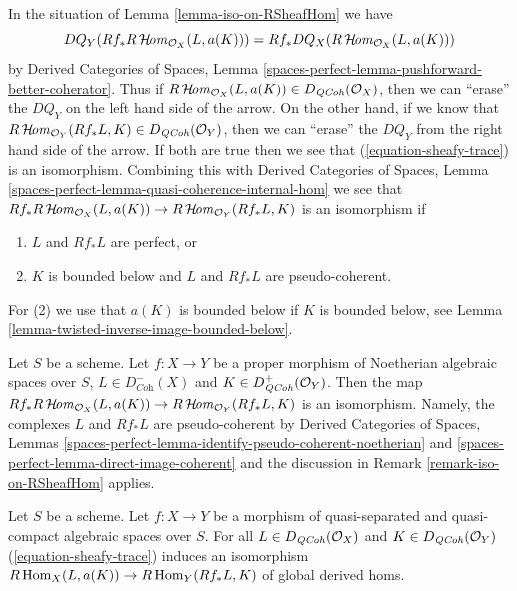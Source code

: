 \begin{remark}
\label{remark-iso-on-RSheafHom}
In the situation of Lemma \ref{lemma-iso-on-RSheafHom} we have
$$
DQ_Y(Rf_*R\mathop{\mathcal{H}\!\mathit{om}}\nolimits_{\mathcal{O}_X}(L, a(K))) =
Rf_* DQ_X(R\mathop{\mathcal{H}\!\mathit{om}}\nolimits_{\mathcal{O}_X}(L, a(K)))
$$
by Derived Categories of Spaces, Lemma
\ref{spaces-perfect-lemma-pushforward-better-coherator}.
Thus if $R\mathop{\mathcal{H}\!\mathit{om}}\nolimits_{\mathcal{O}_X}(L, a(K)) \in D_{\mathit{QCoh}}(\mathcal{O}_X)$,
then we can ``erase'' the $DQ_Y$ on the left hand side of the arrow.
On the other hand, if we know that
$R\mathop{\mathcal{H}\!\mathit{om}}\nolimits_{\mathcal{O}_Y}(Rf_*L, K) \in D_{\mathit{QCoh}}(\mathcal{O}_Y)$,
then we can ``erase'' the $DQ_Y$ from the right hand side of the arrow.
If both are true then we see that (\ref{equation-sheafy-trace})
is an isomorphism. Combining this with
Derived Categories of Spaces, Lemma
\ref{spaces-perfect-lemma-quasi-coherence-internal-hom}
we see that $Rf_*R\mathop{\mathcal{H}\!\mathit{om}}\nolimits_{\mathcal{O}_X}(L, a(K)) \to
R\mathop{\mathcal{H}\!\mathit{om}}\nolimits_{\mathcal{O}_Y}(Rf_*L, K)$ is an isomorphism if
\begin{enumerate}
\item $L$ and $Rf_*L$ are perfect, or
\item $K$ is bounded below and $L$ and $Rf_*L$ are pseudo-coherent.
\end{enumerate}
For (2) we use that $a(K)$ is bounded below if $K$
is bounded below, see Lemma \ref{lemma-twisted-inverse-image-bounded-below}.
\end{remark}

\begin{example}
\label{example-iso-on-RSheafHom-noetherian}
Let $S$ be a scheme.
Let $f : X \to Y$ be a proper morphism of Noetherian algebraic spaces
over $S$, $L \in D^-_{\textit{Coh}}(X)$ and $K \in D^+_{\mathit{QCoh}}(\mathcal{O}_Y)$.
Then the map $Rf_*R\mathop{\mathcal{H}\!\mathit{om}}\nolimits_{\mathcal{O}_X}(L, a(K)) \to
R\mathop{\mathcal{H}\!\mathit{om}}\nolimits_{\mathcal{O}_Y}(Rf_*L, K)$ is an isomorphism.
Namely, the complexes $L$ and $Rf_*L$ are pseudo-coherent by
Derived Categories of Spaces, Lemmas
\ref{spaces-perfect-lemma-identify-pseudo-coherent-noetherian} and
\ref{spaces-perfect-lemma-direct-image-coherent}
and the discussion in Remark \ref{remark-iso-on-RSheafHom} applies.
\end{example}

\begin{lemma}
\label{lemma-iso-global-hom}
Let $S$ be a scheme.
Let $f : X \to Y$ be a morphism of quasi-separated and quasi-compact
algebraic spaces over $S$.
For all $L \in D_{\mathit{QCoh}}(\mathcal{O}_X)$ and $K \in D_{\mathit{QCoh}}(\mathcal{O}_Y)$
(\ref{equation-sheafy-trace}) induces an isomorphism
$R\mathop{\mathrm{Hom}}\nolimits_X(L, a(K)) \to R\mathop{\mathrm{Hom}}\nolimits_Y(Rf_*L, K)$ of global derived homs.
\end{lemma}

